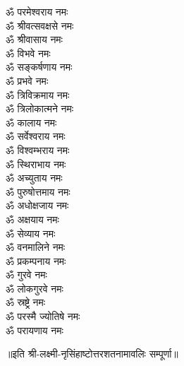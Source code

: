 \begin{multicols}{2}
\begin{flushleft}
ॐ परमेश्वराय नमः\\
ॐ श्रीवत्सवक्षसे नमः\\
ॐ श्रीवासाय नमः\\
ॐ विभवे नमः\\
ॐ सङ्कर्षणाय नमः\\
ॐ प्रभवे नमः\hfill{}\\
ॐ त्रिविक्रमाय नमः\\
ॐ त्रिलोकात्मने नमः\\
ॐ कालाय नमः\\
ॐ सर्वेश्वराय नमः\\
ॐ विश्वम्भराय नमः\\
ॐ स्थिराभाय नमः\\
ॐ अच्युताय नमः\\
ॐ पुरुषोत्तमाय नमः\\
ॐ अधोक्षजाय नमः\\
ॐ अक्षयाय नमः\hfill{}\\
ॐ सेव्याय नमः\\
ॐ वनमालिने नमः\\
ॐ प्रकम्पनाय नमः\\
ॐ गुरवे नमः\\
ॐ लोकगुरवे नमः\\
ॐ स्रष्ट्रे नमः\\
ॐ परस्मै ज्योतिषे नमः\\
ॐ परायणाय नमः\hfill{}\\
\end{flushleft}
\end{multicols}
॥इति श्री-लक्ष्मी-नृसिंहाष्टोत्तरशतनामावलिः सम्पूर्णा॥

